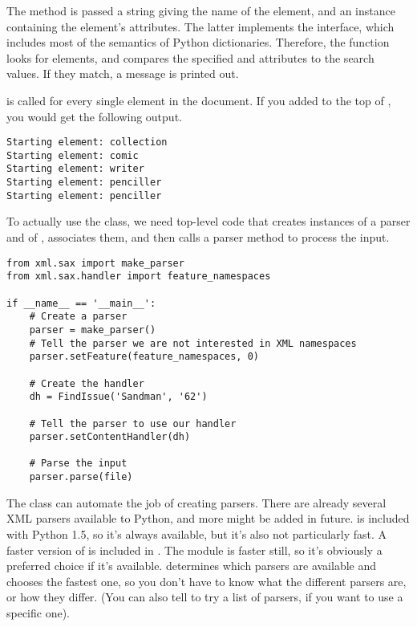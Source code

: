 \documentclass{howto}
\newcommand{\element}[1]{\code{#1}}
\newcommand{\attribute}[1]{\code{#1}}
\begin{document}
The  method is passed a string giving the name
of the element, and an instance containing the element's attributes.
The latter implements the  interface, which
includes most of the semantics of Python dictionaries.  Therefore, the 
function looks for \element{comic} elements, and compares the
specified \attribute{title} and \attribute{number} attributes to the
search values.  If they match, a message is printed out.

 is called for every single element in the
document.  If you added  to the
top of  , you would get the following output.

\begin{verbatim}
Starting element: collection
Starting element: comic
Starting element: writer
Starting element: penciller
Starting element: penciller
\end{verbatim}

To actually use the class, we need top-level code that creates 
instances of a parser and of , associates them, and
then calls a parser method to process the input.

\begin{verbatim}
from xml.sax import make_parser
from xml.sax.handler import feature_namespaces

if __name__ == '__main__':
    # Create a parser
    parser = make_parser()
    # Tell the parser we are not interested in XML namespaces
    parser.setFeature(feature_namespaces, 0)

    # Create the handler
    dh = FindIssue('Sandman', '62')

    # Tell the parser to use our handler
    parser.setContentHandler(dh)

    # Parse the input
    parser.parse(file)
\end{verbatim}

The  class can automate the job of creating
parsers.  There are already several XML parsers available to Python,
and more might be added in future.   is included with
Python 1.5, so it's always available, but it's also not particularly
fast.  A faster version of  is included in
.  The  module is faster
still, so it's obviously a preferred choice if it's available.
 determines which parsers are available and
chooses the fastest one, so you don't have to know what the different
parsers are, or how they differ. (You can also tell
 to try a list of parsers, if you want to use a
specific one).
\end{document}

